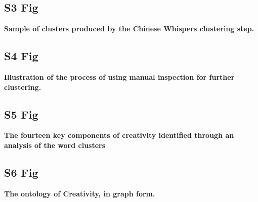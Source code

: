 \documentclass[10pt,letterpaper]{article}
\begin{document}
\subsection*{S3 Fig}
\label{S3_Fig}
{\bf Sample of clusters produced by the Chinese Whispers clustering step.}

\subsection*{S4 Fig}
\label{S4_Fig}
{\bf Illustration of the process of using manual inspection for further clustering.}

\subsection*{S5 Fig}
\label{S5_Fig}
{\bf The fourteen key components of creativity identified through an analysis of the word clusters}

\subsection*{S6 Fig}
\label{S6_Fig}
{\bf The ontology of Creativity, in graph form.}
\end{document}
